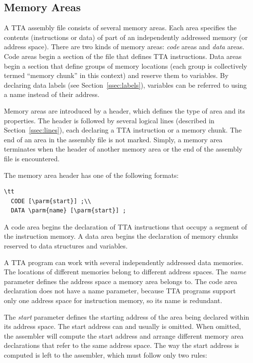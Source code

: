 \documentclass[twoside]{tceusermanual}
\begin{document}
\subsection{Memory Areas}

A TTA assembly file consists of several memory areas. Each area specifies
the contents (instructions or data) of part of an independently addressed
memory (or address space). There are two kinds of memory areas: \emph{code}
areas and \emph{data} areas. Code areas begin a section of the file that
defines TTA instructions.  Data areas begin a section that define groups of
memory locations (each group is collectively termed ``memory chunk'' in this
context) and reserve them to variables. By declaring data labels (see
Section~\ref{ssec:labels}), variables can be referred to using a name
instead of their address.

Memory areas are introduced by a header, which defines the type of area and
its properties. The header is followed by several logical lines (described
in Section~\ref{ssec:lines}), each declaring a TTA instruction or a memory
chunk.  The end of an area in the assembly file is not marked. Simply, a
memory area terminates when the header of another memory area or the end of
the assembly file is encountered.

The memory area header has one of the following formats:
\begin{verbatim}\tt
  CODE [\parm{start}] ;\\
  DATA \parm{name} [\parm{start}] ;
\end{verbatim}

A code area begins the declaration of TTA instructions that occupy a segment
of the instruction memory. A data area begins the declaration of memory
chunks reserved to data structures and variables.

A TTA program can work with several independently addressed data memories.
The locations of different memories belong to different address spaces. The
\emph{name} parameter defines the address space a memory area belongs
to. The code area declaration does not have a name parameter, because TTA
programs support only one address space for instruction memory, so its name
is redundant.

The \emph{start} parameter defines the starting address of the area being
declared within its address space. The start address can and usually is
omitted. When omitted, the assembler will compute the start address and
arrange different memory area declarations that refer to the same address
space. The way the start address is computed is left to the assembler, which
must follow only two rules:
\end{document}

